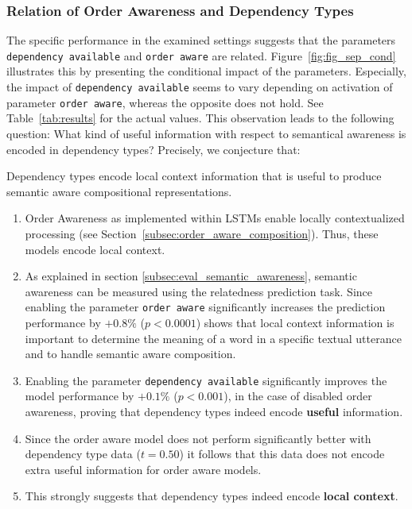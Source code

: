 \subsubsection{Relation of Order Awareness and Dependency Types} \label{subsec:results_relation_OA_DA}
The specific performance in the examined settings suggests that the parameters \texttt{dependency available} and \texttt{order aware} are related. Figure~\ref{fig:fig_sep_cond} illustrates this by presenting the conditional impact of the parameters. Especially, the impact of \texttt{dependency available} seems to vary depending on activation of parameter \texttt{order aware}, whereas the opposite does not hold. See Table~\ref{tab:results} for the actual values. This observation leads to the following question: What kind of useful information with respect to semantical awareness is encoded in dependency types? Precisely, we conjecture %
that:

\begin{conjecture}
	Dependency types encode local context information that is useful to produce semantic aware compositional representations.
\end{conjecture}	
\begin{rationale}
	\begin{enumerate}
		\item Order Awareness as implemented within \ac{LSTM}s enable locally contextualized processing (see Section~\ref{subsec:order_aware_composition}). Thus, these models encode local context.
		\item As explained in section \ref{subsec:eval_semantic_awareness}, semantic awareness can be measured using the relatedness prediction task. Since enabling the parameter \texttt{order aware} significantly increases the prediction performance by $+0.8\%$ ($p < 0.0001$) shows that local context information is important to determine the meaning of a word in a specific textual utterance and to handle semantic aware composition.
		\item Enabling the parameter \texttt{dependency available} significantly improves the model performance by $+0.1\%$ ($p < 0.001$), in the case of disabled order awareness, proving that dependency types indeed encode \textbf{useful} information.
		\item Since the order aware model does not perform significantly better with dependency type data ($t = 0.50$) it follows that this data does not encode extra useful information for order aware models.
		\item This strongly suggests that dependency types indeed encode \textbf{local context}.
	\end{enumerate}
\end{rationale}


